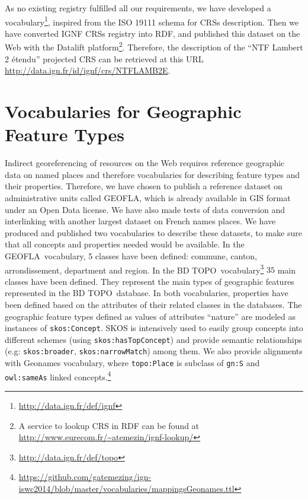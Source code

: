 As no existing registry fulfilled all our requirements, we have developed a vocabulary\footnote{\url{http://data.ign.fr/def/ignf}}, inspired from the ISO 19111 schema for CRSs description. Then we have converted IGNF CRSs registry into RDF, and published this dataset on the Web with the Datalift platform\footnote{A service to lookup CRS in RDF can be found at \url{http://www.eurecom.fr/~atemezin/ignf-lookup/}}. Therefore, the description of the ``NTF Lambert 2 \'{e}tendu'' projected CRS can be retrieved at this URL \url{http://data.ign.fr/id/ignf/crs/NTFLAMB2E}.

\section{Vocabularies for Geographic Feature Types}
\label{sec:vocgeofeature}

Indirect georeferencing of resources on the Web requires reference geographic data on named places and therefore vocabularies for describing feature types and their properties. Therefore, we have chosen to publish a reference dataset on administrative units called GEOFLA\circledR, which is already available in GIS format under an Open Data license. We have also made tests of data conversion and interlinking with another largest dataset on French names places. We have produced and published two vocabularies to describe these datasets, to make sure that all concepts and properties needed would be available.
In the GEOFLA\circledR ~vocabulary, 5 classes have been defined: commune, canton, arrondissement, department and region. In the BD TOPO\circledR ~vocabulary\footnote{\url{http://data.ign.fr/def/topo}} $35$ main classes have been defined. They represent the main types of geographic features represented in the BD TOPO\circledR ~database. In both vocabularies, properties have been defined based on the attributes of their related classes in the databases. The geographic feature types defined as values of attributes ``nature'' are modeled as instances of \texttt{skos:Concept}. SKOS is intensively used to easily group concepts into different schemes (using \texttt{skos:hasTopConcept}) and provide semantic relationships (e.g: \texttt{skos:broader}, \texttt{skos:narrowMatch}) among them. We also provide alignments with Geonames vocabulary, where \texttt{topo:Place} is subclass of \texttt{gn:S} and \texttt{owl:sameAs} linked concepts.\footnote{\url{https://github.com/gatemezing/ign-iswc2014/blob/master/vocabularies/mappingsGeonames.ttl}} 

